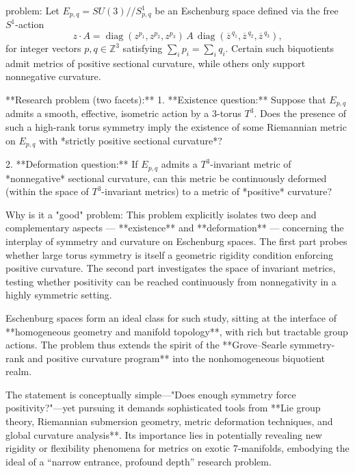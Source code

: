 problem:  
Let \( E_{p,q} = SU(3)//S^1_{p,q} \) be an Eschenburg space defined via the free \( S^1 \)-action  
\[
z \cdot A = \operatorname{diag}(z^{p_1}, z^{p_2}, z^{p_3})\, A \,\operatorname{diag}(\overline{z}^{\,q_1}, \overline{z}^{\,q_2}, \overline{z}^{\,q_3}),
\]
for integer vectors \( p, q \in \mathbb{Z}^3 \) satisfying \( \sum_i p_i = \sum_i q_i \).  
Certain such biquotients admit metrics of positive sectional curvature, while others only support nonnegative curvature.  

**Research problem (two facets):**  
1. **Existence question:**  
   Suppose that \( E_{p,q} \) admits a smooth, effective, isometric action by a 3-torus \( T^3 \).  
   Does the presence of such a high-rank torus symmetry imply the existence of some Riemannian metric on \( E_{p,q} \) with *strictly positive sectional curvature*?  

2. **Deformation question:**  
   If \( E_{p,q} \) admits a \( T^3 \)-invariant metric of *nonnegative* sectional curvature, can this metric be continuously deformed (within the space of \( T^3 \)-invariant metrics) to a metric of *positive* curvature?  

Why is it a "good" problem:  
This problem explicitly isolates two deep and complementary aspects — **existence** and **deformation** — concerning the interplay of symmetry and curvature on Eschenburg spaces. The first part probes whether large torus symmetry is itself a geometric rigidity condition enforcing positive curvature. The second part investigates the space of invariant metrics, testing whether positivity can be reached continuously from nonnegativity in a highly symmetric setting.  

Eschenburg spaces form an ideal class for such study, sitting at the interface of **homogeneous geometry and manifold topology**, with rich but tractable group actions. The problem thus extends the spirit of the **Grove–Searle symmetry-rank and positive curvature program** into the nonhomogeneous biquotient realm.  

The statement is conceptually simple—"Does enough symmetry force positivity?"—yet pursuing it demands sophisticated tools from **Lie group theory, Riemannian submersion geometry, metric deformation techniques, and global curvature analysis**. Its importance lies in potentially revealing new rigidity or flexibility phenomena for metrics on exotic 7‑manifolds, embodying the ideal of a “narrow entrance, profound depth” research problem.